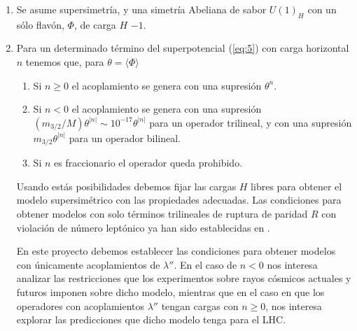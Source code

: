 \documentclass[11pt]{article}
\begin{document}
\begin{enumerate}
\item Se asume supersimetría,   y una simetría Abeliana de sabor $U(1)_H$ con un sólo flavón, $\Phi$, de carga $H$ $-1$.

\item Para un determinado término del superpotencial (\ref{eq:5}) con carga horizontal $n$ tenemos que, para $\theta=\langle\Phi\rangle$
  \begin{enumerate}
  \item Si $n\ge 0$ el acoplamiento se genera con una supresión $\theta^n$.
  \item Si $n<0$ el acoplamiento se genera con una supresión $(m_{3/2}/M)\theta^{|n|}\sim 10^{-17}\theta^{|n|}$ para un operador trilineal, y con una supresión $m_{3/2}\theta^{|n|}$ para un operador bilineal.
  \item Si $n$ es fraccionario el operador queda prohibido.
  \end{enumerate}
Usando estás posibilidades debemos fijar las cargas $H$ libres para obtener el modelo supersimétrico con las propiedades adecuadas. Las condiciones para obtener modelos con solo términos trilineales de ruptura de paridad $R$ con violación de número leptónico ya han sido establecidas en \cite{Sierra:2009zq}.

En este proyecto debemos establecer las condiciones para obtener modelos con únicamente acoplamientos de $\lambda''$. En el caso de $n<0$ nos interesa analizar las restricciones que los experimentos sobre rayos cósmicos actuales y futuros imponen sobre dicho modelo, mientras que en el caso en que los operadores con acoplamientos $\lambda''$ tengan cargas con $n\ge 0$, nos interesa explorar las predicciones que dicho modelo tenga para el LHC.
\end{enumerate}
\end{document}
